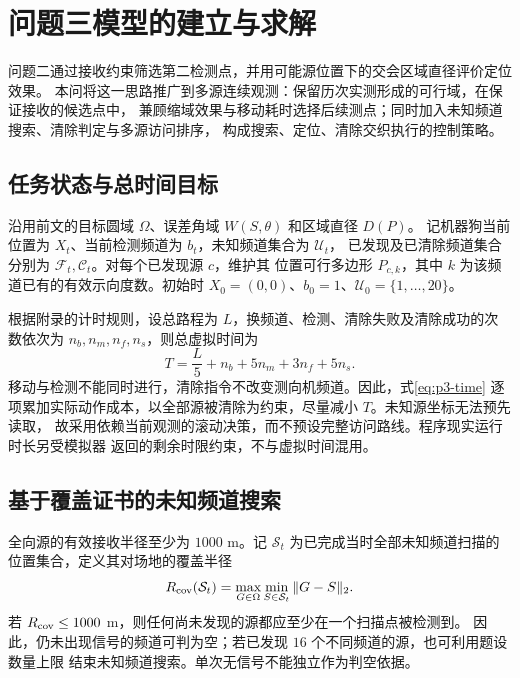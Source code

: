 \section{问题三模型的建立与求解}
\label{sec:p3-model}

问题二通过接收约束筛选第二检测点，并用可能源位置下的交会区域直径评价定位效果。
本问将这一思路推广到多源连续观测：保留历次实测形成的可行域，在保证接收的候选点中，
兼顾缩域效果与移动耗时选择后续测点；同时加入未知频道搜索、清除判定与多源访问排序，
构成搜索、定位、清除交织执行的控制策略。

\subsection{任务状态与总时间目标}

沿用前文的目标圆域 $\Omega$、误差角域 $W(S,\theta)$ 和区域直径 $D(P)$。
记机器狗当前位置为 $X_t$、当前检测频道为 $b_t$，未知频道集合为 $\mathcal U_t$，
已发现及已清除频道集合分别为 $\mathcal F_t,\mathcal C_t$。对每个已发现源 $c$，维护其
位置可行多边形 $P_{c,k}$，其中 $k$ 为该频道已有的有效示向度数。初始时
$X_0=(0,0)$、$b_0=1$、$\mathcal U_0=\{1,\ldots,20\}$。

根据附录的计时规则，设总路程为 $L$，换频道、检测、清除失败及清除成功的次数依次为
$n_b,n_m,n_f,n_s$，则总虚拟时间为
\begin{equation}\label{eq:p3-time}
T=\frac{L}{5}+n_b+5n_m+3n_f+5n_s.
\end{equation}
移动与检测不能同时进行，清除指令不改变测向机频道。因此，式\eqref{eq:p3-time}
逐项累加实际动作成本，以全部源被清除为约束，尽量减小 $T$。未知源坐标无法预先读取，
故采用依赖当前观测的滚动决策，而不预设完整访问路线。程序现实运行时长另受模拟器
返回的剩余时限约束，不与虚拟时间混用。

\subsection{基于覆盖证书的未知频道搜索}

全向源的有效接收半径至少为 $1000$ m。记 $\mathcal S_t$ 为已完成当时全部未知频道扫描的
位置集合，定义其对场地的覆盖半径
\begin{equation}\label{eq:p3-cover}
R_{\rm cov}(\mathcal S_t)=\max_{G\in\Omega}\min_{S\in\mathcal S_t}\|G-S\|_2.
\end{equation}
若 $R_{\rm cov}\le1000$ m，则任何尚未发现的源都应至少在一个扫描点被检测到。
因此，仍未出现信号的频道可判为空；若已发现 $16$ 个不同频道的源，也可利用题设数量上限
结束未知频道搜索。单次无信号不能独立作为判空依据。

